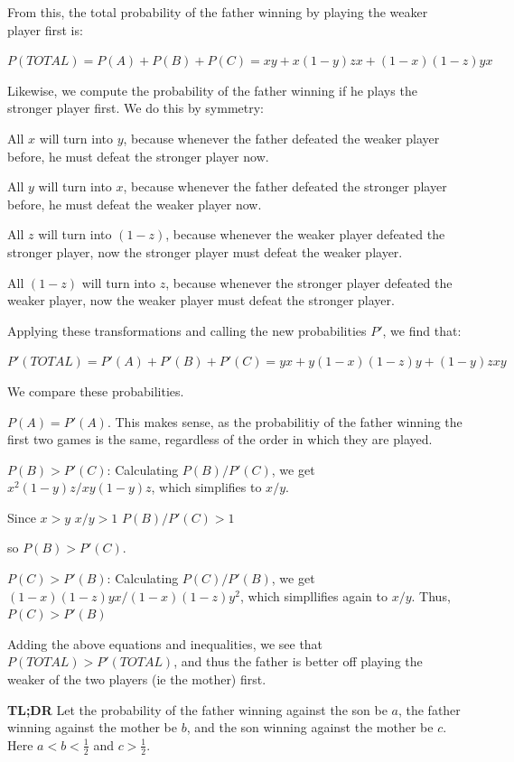 \begin{enumerate}
 From this, the total probability of the father winning by playing the weaker player first is:

 $P(TOTAL) = P(A) + P(B) + P(C) = xy + x(1-y)zx + (1-x)(1-z)yx$

 Likewise, we compute the probability of the father winning if he plays the stronger player first.  We do this by symmetry:

 All $x$ will turn into $y$, because whenever the father defeated the weaker player before, he must defeat the stronger player now.

 All $y$ will turn into $x$, because whenever the father defeated the stronger player before, he must defeat the weaker player now.

 All $z$ will turn into $(1-z)$, because whenever the weaker player defeated the stronger player, now the stronger player must defeat the weaker player.

 All $(1-z)$ will turn into $z$, because whenever the stronger player defeated the weaker player, now the weaker player must defeat the stronger player.

 Applying these transformations and calling the new probabilities $P'$, we find that:

 $P'(TOTAL) = P'(A) + P'(B) + P'(C) = yx + y(1-x)(1-z)y + (1-y)zxy$

 We compare these probabilities.

 $P(A) = P'(A)$.  This makes sense, as the probabilitiy of the father winning the first two games is the same, regardless of the order in which they are played.

 $P(B) > P'(C)$:  Calculating $P(B) / P'(C)$, we get $x^2(1-y)z / xy(1-y)z$, which simplifies to $x/y$.  

 Since $x > y$
$x/y > 1$
$P(B) / P'(C) > 1$

 so $P(B) > P'(C)$.

 $P(C) > P'(B)$:  Calculating $P(C) / P'(B)$, we get $(1-x)(1-z)yx / (1-x)(1-z)y^2$, which simpllifies again to $x/y$.  Thus, $P(C) > P'(B)$ 

 Adding the above equations and inequalities, we see that $P(TOTAL) > P'(TOTAL)$, and thus the father is better off playing the weaker of the two players (ie the mother) first.

 \textbf{TL;DR} Let the probability of the father winning against the son be $a$, the father winning against the mother be $b$, and the son winning against the mother be $c$. Here $a<b<\frac{1}{2}$ and $c>\frac{1}{2}$.


\end{enumerate}
